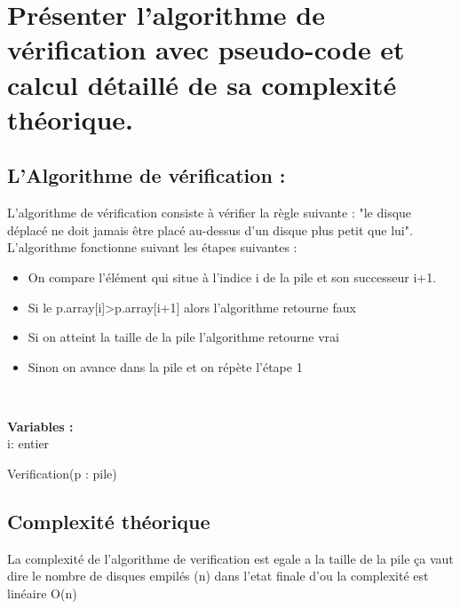 \section{Présenter l’algorithme de vérification avec pseudo-code et calcul détaillé de sa complexité théorique.}
\subsection{L'Algorithme de vérification :}
L’algorithme de vérification consiste à vérifier la règle suivante : "le disque déplacé ne doit jamais être placé au-dessus d’un disque plus petit que lui".  
L’algorithme fonctionne suivant les étapes suivantes :
\begin{itemize}
\item On compare l’élément qui situe à l’indice i de la pile et son successeur i+1.
\item Si le p.array[i]>p.array[i+1] alors l’algorithme retourne faux
\item  Si on atteint la taille de la pile l’algorithme retourne vrai
\item Sinon on avance dans la pile et on répète l’étape 1
\end{itemize}
	

\par
\\
\begin{function}[H]
\textbf{Variables :}\\
    i: entier\;
    \caption{Verification(p : pile)}
\end{function}
\subsection{Complexité théorique}
La complexité  de l'algorithme de verification  est egale a la taille de la pile ça vaut dire le nombre de disques empilés (n) dans l'etat finale  d'ou la complexité est linéaire O(n)

